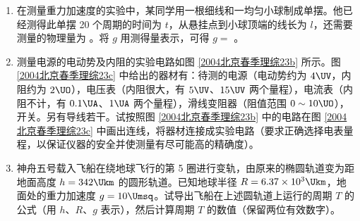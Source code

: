\documentclass[\gkver]{gaokaozhenti}
\begin{document}
\begin{enumerate}
\item
在测量重力加速度的实验中，某同学用一根细线和一均匀小球制成单摆。他已经测得此单摆 20 个周期的时间为 $t$，从悬挂点到小球顶端的线长为 $l$，还需要测量的物理量为 。将 $g$ 用测得量表示，可得 $g=$ 。

\item
测量电源的电动势及内阻的实验电路如图 \ref{2004北京春季理综23b} 所示。图 \ref{2004北京春季理综23c} 中给出的器材有：待测的电源（电动势约为 $4\UV$，内阻约为 $2\UO$），电压表（内阻很大，有 $5\UV$、$15\UV$ 两个量程），电流表（内阻不计，有 $0.1\UA$、$1\UA$ 两个量程），滑线变阻器（阻值范围 $0\sim10\UO$），开关。另有导线若干。试按照图 \ref{2004北京春季理综23b} 中的电路在图 \ref{2004北京春季理综23c} 中画出连线，将器材连接成实验电路（要求正确选择电表量程，以保证仪器的安全并使测量有尽可能高的精确度）。



\item
神舟五号载入飞船在绕地球飞行的第 5 圈进行变轨，由原来的椭圆轨道变为距地面高度 $h=342\Ukm$ 的圆形轨道。已知地球半径 $R=6.37\times10^{3}\Ukm$，地面处的重力加速度 $g=10\Umsq$。试导出飞船在上述圆轨道上运行的周期 $T$ 的公式（用 $h$、$R$、$g$ 表示），然后计算周期 $T$ 的数值（保留两位有效数字）。


\end{enumerate}
\end{document}
